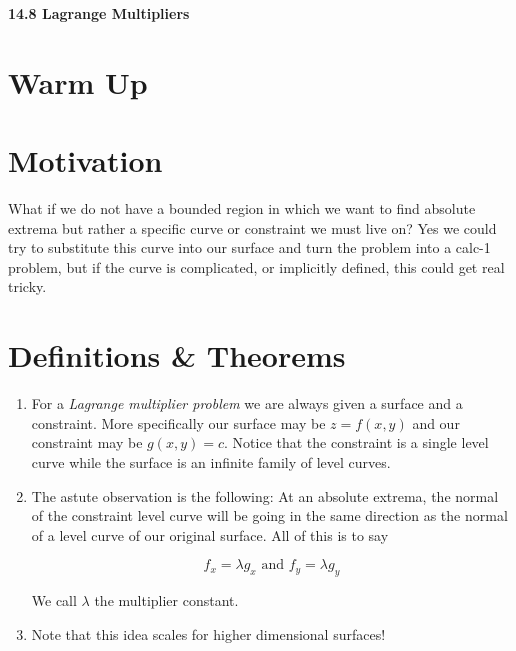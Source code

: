 \documentclass[11pt]{article}
\newcommand{\vs}{\vspace*{.1in}}
\begin{document}
\begin{LARGE}\begin{center}\bf 14.8 Lagrange Multipliers\end{center}
\end{LARGE}

\vs\vs



\section{Warm Up}



\section{Motivation}
What if we do not have a bounded region in which we want to find absolute extrema but rather a specific curve or constraint we must live on? Yes we could try to substitute this curve into our surface and turn the problem into a calc-1 problem, but if the curve is complicated, or implicitly defined, this could get real tricky.


\section{Definitions \& Theorems}

\begin{enumerate}
\item For a \emph{Lagrange multiplier problem} we are always given a surface and a constraint. More specifically our surface may be $z=f(x,y)$ and our constraint may be $g(x,y) = c$. Notice that the constraint is a single level curve while the surface is an infinite family of level curves.

\item The astute observation is the following: At an absolute extrema, the normal of the constraint level curve will be going in the same direction as the normal of a level curve of our original surface. All of this is to say 

\[f_x = \lambda g_x \text{ and } f_y = \lambda g_y\]


We call $\lambda$ the multiplier constant.


\item Note that this idea scales for higher dimensional surfaces!




\end{enumerate}
\end{document}
